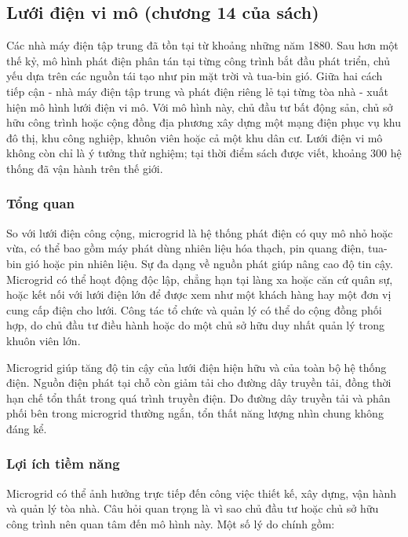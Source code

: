 \documentclass{thesis}
\begin{document}
\subsection{Lưới điện vi mô (chương 14 của sách)}

Các nhà máy điện tập trung đã tồn tại từ khoảng những năm 1880. Sau
hơn một thế kỷ, mô hình phát điện phân tán tại từng công trình bắt
đầu phát triển, chủ yếu dựa trên các nguồn tái tạo như pin mặt trời
và tua-bin gió. Giữa hai cách tiếp cận - nhà máy điện tập trung và
phát điện riêng lẻ tại từng tòa nhà - xuất hiện mô hình lưới điện vi
mô. Với mô hình này, chủ đầu tư bất động sản, chủ sở hữu công trình
hoặc cộng đồng địa phương xây dựng một mạng điện phục vụ khu đô thị,
khu công nghiệp, khuôn viên hoặc cả một khu dân cư. Lưới điện vi mô
không còn chỉ là ý tưởng thử nghiệm; tại thời điểm sách được viết,
khoảng 300 hệ thống đã vận hành trên thế giới.

\subsubsection{Tổng quan}

So với lưới điện công cộng, microgrid là hệ thống phát điện có quy mô
nhỏ hoặc vừa, có thể bao gồm máy phát dùng nhiên liệu hóa thạch, pin
quang điện, tua-bin gió hoặc pin nhiên liệu. Sự đa dạng về nguồn phát
giúp nâng cao độ tin cậy. Microgrid có thể hoạt động độc lập, chẳng
hạn tại làng xa hoặc căn cứ quân sự, hoặc kết nối với lưới điện lớn
để được xem như một khách hàng hay một đơn vị cung cấp điện cho lưới.
Công tác tổ chức và quản lý có thể do cộng đồng phối hợp, do chủ đầu
tư điều hành hoặc do một chủ sở hữu duy nhất quản lý trong khuôn viên lớn.

Microgrid giúp tăng độ tin cậy của lưới điện hiện hữu và của toàn bộ
hệ thống điện. Nguồn điện phát tại chỗ còn giảm tải cho đường dây
truyền tải, đồng thời hạn chế tổn thất trong quá trình truyền điện.
Do đường dây truyền tải và phân phối bên trong microgrid thường ngắn,
tổn thất năng lượng nhìn chung không đáng kể.

\subsubsection{Lợi ích tiềm năng}

Microgrid có thể ảnh hưởng trực tiếp đến công việc thiết kế, xây
dựng, vận hành và quản lý tòa nhà. Câu hỏi quan trọng là vì sao chủ
đầu tư hoặc chủ sở hữu công trình nên quan tâm đến mô hình này. Một
số lý do chính gồm:
\end{document}
